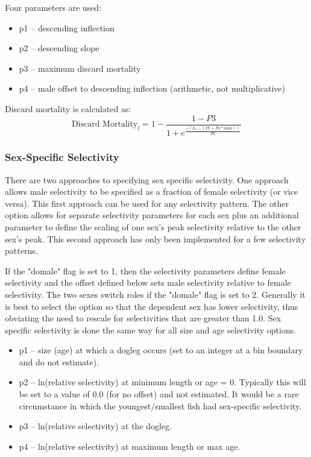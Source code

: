 Four parameters are used:
\begin{itemize}
	\item p1 – descending inflection
	\item p2 – descending slope
	\item p3 – maximum discard mortality
	\item p4 – male offset to descending inflection (arithmetic, not multiplicative)
\end{itemize}

Discard mortality is calculated as:
\begin{equation}
	\text{Discard Mortality}_l = 1 - \frac{1-P3}{1+e^{\frac{-(L_l-(P1+P4*male))}{P2}}}
\end{equation}

\subsubsection{Sex-Specific Selectivity}
There are two approaches to specifying sex specific selectivity.  One approach allows male selectivity to be specified as a fraction of female selectivity (or vice versa).  This first approach can be used for any selectivity pattern.  The other option allows for separate selectivity parameters for each sex plus an additional parameter to define the scaling of one sex’s peak selectivity relative to the other sex’s peak.  This second approach has only been implemented for a few selectivity patterns.

If the "domale" flag is set to 1, then the selectivity parameters define female selectivity and the offset defined below sets male selectivity relative to female selectivity.  The two sexes switch roles if the "domale" flag is set to 2.  Generally it is best to select the option so that the dependent sex has lower selectivity, thus obviating the need to rescale for selectivities that are greater than 1.0. Sex specific selectivity is done the same way for all size and age selectivity options.
\begin{itemize}
	\item p1 – size (age) at which a dogleg occurs (set to an integer at a bin boundary and do not estimate).
	\item p2 – ln(relative selectivity) at minimum length or age = 0.  Typically this will be set to a value of 0.0 (for no offset) and not estimated.  It would be a rare circumstance in which the youngest/smallest fish had sex-specific selectivity.
	\item p3 – ln(relative selectivity) at the dogleg.
	\item p4 – ln(relative selectivity) at maximum length or max age.
\end{itemize}

